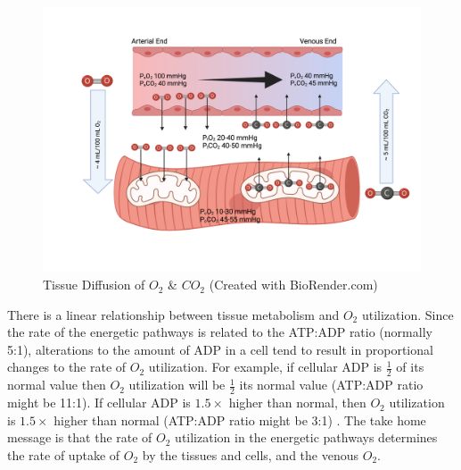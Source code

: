 \begin{figure}[!h]
    \centering
    \includegraphics[width=1.0\linewidth]{./figure/tissue_diffusion.png}
    \caption{Tissue Diffusion of $O_2$ \& $CO_2$ \footnotesize{(Created with BioRender.com)}}
    \label{fig:tissue_diffusion}
\end{figure}

There is a linear relationship between tissue metabolism and $O_2$ utilization. Since the rate of the energetic pathways is related to the ATP:ADP ratio (normally 5:1), alterations to the amount of ADP in a cell tend to result in proportional changes to the rate of $O_2$ utilization. For example, if cellular ADP is $\frac{1}{2}$ of its normal value then $O_2$ utilization will be $\frac{1}{2}$ its normal value (ATP:ADP ratio might be 11:1). If cellular ADP is $1.5 \times$ higher than normal, then $O_2$ utilization is $1.5 \times$ higher than normal (ATP:ADP ratio might be 3:1) \cite{hall_guyton_2020}. The take home message is that the rate of $O_2$ utilization in the energetic pathways determines the rate of uptake of $O_2$ by the tissues and cells, and the venous $O_2$. 

